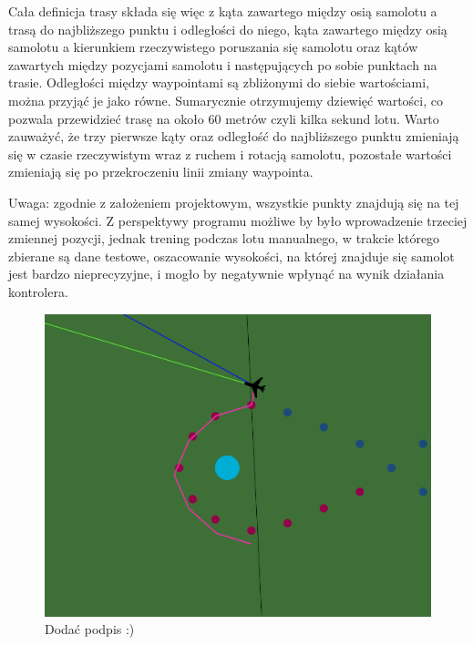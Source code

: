 \documentclass[12pt, a4paper]{article}
\begin{document}
Cała definicja trasy składa się więc z kąta zawartego między osią samolotu a trasą do najbliższego punktu i odległości do niego, kąta zawartego między osią samolotu a kierunkiem rzeczywistego poruszania się samolotu oraz kątów zawartych między pozycjami samolotu i następujących po sobie punktach na trasie. Odległości między waypointami są zbliżonymi do siebie wartościami, można przyjąć je jako równe. Sumarycznie otrzymujemy dziewięć wartości, co pozwala przewidzieć trasę na około 60 metrów czyli kilka sekund lotu. Warto zauważyć, że trzy pierwsze kąty oraz odległość do najbliższego punktu zmieniają się w czasie rzeczywistym wraz z ruchem i rotacją samolotu, pozostałe wartości zmieniają się po przekroczeniu linii zmiany waypointa. 

Uwaga: zgodnie z założeniem projektowym, wszystkie punkty znajdują się na tej samej wysokości. Z perspektywy programu możliwe by było wprowadzenie trzeciej zmiennej pozycji, jednak trening podczas lotu manualnego, w trakcie którego zbierane są dane testowe, oszacowanie wysokości, na której znajduje się samolot jest bardzo nieprecyzyjne, i mogło by negatywnie wpłynąć na wynik działania kontrolera.

\begin{figure}[ht]
    \centering
    \includegraphics[width=1\textwidth]{estymacja}
    \caption{Dodać podpis :)}
\end{figure}

 \FloatBarrier
\end{document}
